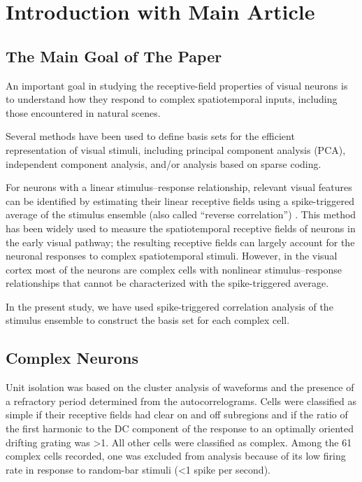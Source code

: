 \documentclass[12pt,a4paper,colorlinks=true]{article}
\begin{document}
	\section{Introduction with Main Article} \label{S01}
	
	\subsection{The Main Goal of The Paper} \label{S01_1}
	
	An important goal in studying the receptive-field properties of
	visual neurons is to understand how they respond to complex
	spatiotemporal inputs, including those encountered in natural
	scenes.
	
	Several methods have been used to define
	basis sets for the efficient representation of visual stimuli, including
	principal component analysis (PCA), independent component
	analysis, and/or analysis based on sparse coding.
	
	For neurons with a linear stimulus–response relationship, relevant
	visual features can be identified by estimating their linear
	receptive fields using a spike-triggered average of the stimulus
	ensemble (also called “reverse correlation”) . This method has been widely used to measure the spatiotemporal receptive fields of neurons in the early visual
	pathway; the resulting receptive fields can largely account for the neuronal responses to complex spatiotemporal stimuli. However, in the visual cortex most of the neurons are complex cells with nonlinear stimulus–response relationships that
	cannot be characterized with the spike-triggered average.
	
	In the present study, we have used spike-triggered correlation analysis of
	the stimulus ensemble to construct the basis set for each complex cell.
	
	\subsection{Complex Neurons} \label{S01_2}
	
	Unit isolation was based on the
	cluster analysis of waveforms and the presence of a refractory period
	determined from the autocorrelograms. Cells were classified as simple if
	their receptive fields had clear on and off subregions and if the ratio of the first harmonic to the DC component of the
	response to an optimally oriented drifting grating was >1. All other cells were classified as complex. Among the 61 complex
	cells recorded, one was excluded from analysis because of its low firing
	rate in response to random-bar stimuli (<1 spike per second).
	
\end{document}
